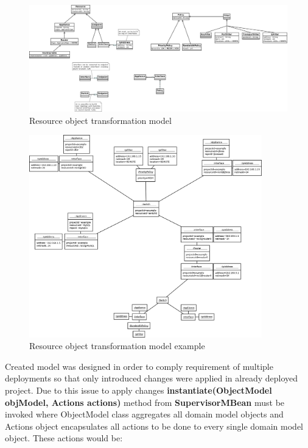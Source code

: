 \documentclass[11pt]{book}
\begin{document}
      \begin{figure}[H]
        \begin{center}
          \includegraphics[width=1.2\textwidth, angle=90]{img/impl/resource-object-model.png}
        \end{center}
        \caption{Resource object transformation model}
      \end{figure}

      \begin{figure}[H]
        \begin{center}
          \includegraphics[width=0.9\textwidth]{img/impl/resource-object-model-example.png}
        \end{center}
        \caption{Resource object transformation model example}
      \end{figure}

      Created model was designed in order to comply requirement of multiple deployments so that only introduced changes
      were applied in already deployed project. Due to this issue to apply changes \textbf{instantiate(ObjectModel
      objModel, Actions actions)} method from \textbf{SupervisorMBean} must be invoked where ObjectModel class
      aggregates all domain model objects and Actions object encapsulates all actions to be done to every single domain
      model object. These actions would be:
\end{document}

